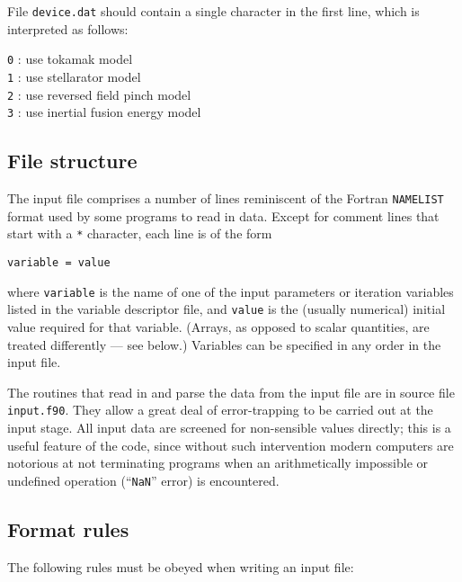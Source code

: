 \documentclass[11pt,a4paper]{report}
\begin{document}
File \texttt{device.dat} should contain a single character in the first
line, which is interpreted as follows:
\begin{tabbing}
\hspace{15mm}\= \texttt{0} : use tokamak model \\
\> \texttt{1} : use stellarator model \\
\> \texttt{2} : use reversed field pinch model \\
\> \texttt{3} : use inertial fusion energy model
\end{tabbing}

\subsection{File structure}

The input file comprises a number of lines reminiscent of the Fortran
\texttt{NAMELIST} format used by some programs to read in data. Except for
comment lines that start with a \texttt{*} character, each line is of the form
\begin{verbatim}
variable = value
\end{verbatim}
where \texttt{variable} is the name of one of the input parameters or
iteration variables listed in the variable descriptor file, and \texttt{value}
is the (usually numerical) initial value required for that variable. (Arrays,
as opposed to scalar quantities, are treated differently --- see below.)
Variables can be specified in any order in the input file.

The routines that read in and parse the data from the input file are in source
file \texttt{input.f90}. They allow a great deal of error-trapping to be
carried out at the input stage.  All input data are screened for non-sensible
values directly; this is a useful feature of the code, since without such
intervention modern computers are notorious at not terminating programs when
an arithmetically impossible or undefined operation (``\texttt{NaN}'' error)
is encountered.

\subsection{Format rules}

The following rules must be obeyed when writing an input file:
\end{document}
